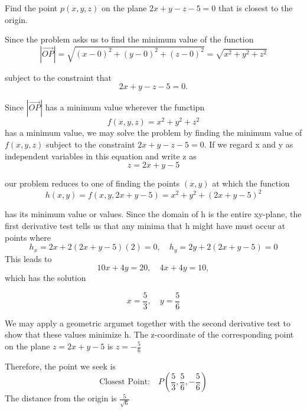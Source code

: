 \documentclass[12pt,a4paper]{article}
\begin{document}
\begin{example}
    Find the point \(p(x,y,z)\) on the plane \(2x + y  -z -5 = 0\) that is closest to the origin.

    \begin{solution}
        Since the problem asks us to find the minimum value of the function
        \[\left|\overrightarrow{OP}\right| = \sqrt{(x-0)^2 + (y-0)^2 + (z- 0)^2} = \sqrt{x^2 + y^2 + z^2}  \]



        subject to the constraint that
        \[2x + y -z - 5 =0.\]

        Since \(\left|\overrightarrow{OP}\right|\) has a minimum value wherever the functipn
        \[f(x,y,z) = x^2 + y^2 + z^2\]
        has a minimum value, we may solve the problem by finding the minimum value of \(f(x,y,z)\) subject to the constraint \(2x + y - z -5 = 0\). If we regard x and y as independent variables in this equation and write z as
        \[z = 2x + y - 5\]

        our problem reduces to one of finding the points \((x,y)\) at which the function
        \[h(x,y) = f(x,y, 2x + y -5) = x^2 + y^2 + (2x + y -5)^2\]

        has its minimum value or values. Since the domain of h is the entire xy-plane, the first derivative test tells us that any minima that h might have must occur at points where
        \[h_x = 2x + 2(2x+ y -5)(2) = 0, \quad h_y = 2y + 2(2x+y-5) = 0\]
        This leads to 
        \[10x + 4y = 20, \quad 4x + 4y = 10,\]
        which has the solution

        \[x = \frac{5}{3}, \quad y = \frac56\]

        We may apply a geometric argumet together with the second derivative test to show that these values minimize h. The z-coordinate of the corresponding point on the plane \(z = 2x + y -5\) is \(z = -\frac56\)

        Therefore, the point we seek is 
        \[\text{Closest Point:} \quad P \left(\frac53,\frac56,-\frac56\right)\]
        The distance from the origin is \(\frac{5}{\sqrt{6}}\)





    \end{solution}

   
\end{example}
\end{document}
